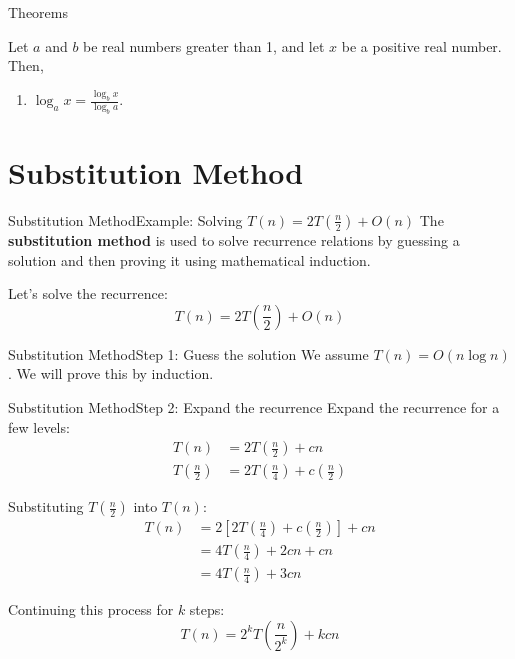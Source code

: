 \documentclass{beamer}
\begin{document}
\begin{frame}{Theorems}
    \begin{theorem}\label{theo:three}
        Let $a$ and $b$ be real numbers greater than 1, and let $x$ be a positive real number. Then,
        \begin{enumerate}
         \item $\log_a x = \frac{\log_b x}{\log_b a}$.
        \end{enumerate}
    \end{theorem}
\end{frame}

\section*{Substitution Method}

\begin{frame}{Substitution Method}{Example: Solving $T(n) = 2T(\frac{n}{2}) + O(n)$}
    The \textbf{substitution method} is used to solve recurrence relations by guessing a solution and then proving it using mathematical induction.

    Let's solve the recurrence:
    \begin{equation*}
        T(n) = 2T \left(\frac{n}{2}\right) + O(n)
    \end{equation*}
\end{frame}

\begin{frame}{Substitution Method}{Step 1: Guess the solution}
    We assume $T(n) = O(n \log n)$. We will prove this by induction.
\end{frame}

\begin{frame}{Substitution Method}{Step 2: Expand the recurrence}
    Expand the recurrence for a few levels:
    \begin{align*}
    T(n) &= 2T\left(\frac{n}{2}\right) + cn \\
    T\left(\frac{n}{2}\right) &= 2T\left(\frac{n}{4}\right) + c\left(\frac{n}{2}\right)
    \end{align*}

    Substituting $T\left(\frac{n}{2}\right)$ into $T(n)$:
    \begin{align*}
    T(n) &= 2\left[ 2T\left(\frac{n}{4}\right) + c\left(\frac{n}{2}\right) \right] + cn \\
         &= 4T\left(\frac{n}{4}\right) + 2cn + cn \\
         &= 4T\left(\frac{n}{4}\right) + 3cn
    \end{align*}

    Continuing this process for $k$ steps:
    \begin{equation*}
    T(n) = 2^k T\left(\frac{n}{2^k}\right) + kcn
    \end{equation*}
\end{frame}
\end{document}
